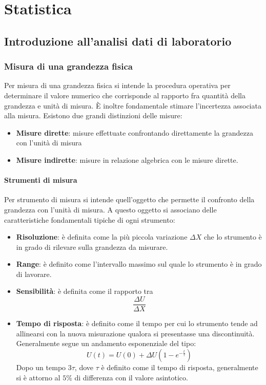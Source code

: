 \documentclass[11pt,a4paper]{book}
\begin{document}
\part{Statistica}
\chapter[Analisi dati laboratorio]{Introduzione all'analisi dati di laboratorio}
\section{Misura di una grandezza fisica}
Per misura di una grandezza fisica si intende la procedura operativa per determinare il valore numerico che corrisponde al rapporto fra quantità della grandezza e unità di misura. \`{E} inoltre fondamentale stimare l'incertezza associata alla misura. Esistono due grandi distinzioni delle misure:
\begin{itemize} \label{1.1_misure dirette o indirette} 
\item \textbf{Misure dirette}: misure effettuate confrontando direttamente la grandezza con l'unità di misura
\item \textbf{Misure indirette}: misure in relazione algebrica con le misure dirette.
\end{itemize}
\subsection{Strumenti di misura} 
Per strumento di misura si intende quell'oggetto che permette il confronto della grandezza con l'unità di misura. A questo oggetto si associano delle caratteristiche fondamentali tipiche di ogni strumento:
\begin{itemize} 
\item \textbf{Risoluzione}: è definita come la più piccola variazione  $ \Delta X $ che lo strumento è in grado di rilevare sulla grandezza da misurare.
\item \textbf{Range}: è definito come l'intervallo massimo sul quale lo strumento è in grado di lavorare.
\item \textbf{Sensibilità}: è definita come il rapporto tra \[ \frac{\Delta U}{\Delta X} \]
\item \textbf{Tempo di risposta}: è definito come il tempo per cui lo strumento tende ad allinearsi con la nuova misurazione qualora si presentasse una discontinuità. Generalmente segue un andamento esponenziale del tipo: \[ U(t) = U(0) + \Delta U (1- e^{-\frac{t}{\tau}} ) \]Dopo un tempo $3 \tau$, dove $ \tau $ è definito come il tempo di risposta, generalmente si è attorno al $5 \%$ di differenza con il valore asintotico.
\end{itemize}
\end{document}
